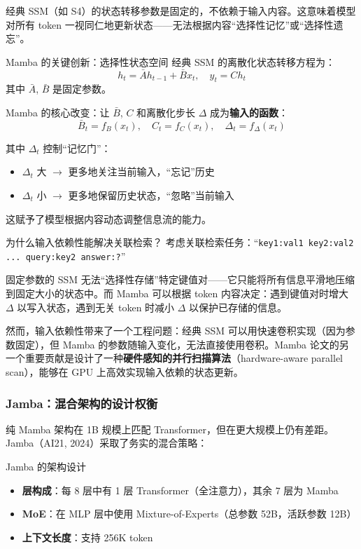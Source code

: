 经典 SSM（如 S4）的状态转移参数是固定的，不依赖于输入内容。这意味着模型对所有 token 一视同仁地更新状态——无法根据内容``选择性记忆''或``选择性遗忘''。

\begin{importantbox}{Mamba 的关键创新：选择性状态空间}
经典 SSM 的离散化状态转移方程为：
$$h_t = \bar{A} h_{t-1} + \bar{B} x_t, \quad y_t = C h_t$$
其中 $\bar{A}$, $\bar{B}$ 是固定参数。

Mamba 的核心改变：让 $\bar{B}$, $C$ 和离散化步长 $\Delta$ 成为\textbf{输入的函数}：
$$\bar{B}_t = f_B(x_t), \quad C_t = f_C(x_t), \quad \Delta_t = f_\Delta(x_t)$$

其中 $\Delta_t$ 控制``记忆门''：
\begin{itemize}
    \item $\Delta_t$ 大 $\rightarrow$ 更多地关注当前输入，``忘记''历史
    \item $\Delta_t$ 小 $\rightarrow$ 更多地保留历史状态，``忽略''当前输入
\end{itemize}
这赋予了模型根据内容动态调整信息流的能力。
\end{importantbox}

\begin{knowledgebox}{为什么输入依赖性能解决关联检索？}
考虑关联检索任务：``\texttt{key1:val1 key2:val2 ... query:key2 answer:?}''

固定参数的 SSM 无法``选择性存储''特定键值对——它只能将所有信息平滑地压缩到固定大小的状态中。而 Mamba 可以根据 token 内容决定：遇到键值对时增大 $\Delta$ 以写入状态，遇到无关 token 时减小 $\Delta$ 以保护已存储的信息。
\end{knowledgebox}

然而，输入依赖性带来了一个工程问题：经典 SSM 可以用快速卷积实现（因为参数固定），但 Mamba 的参数随输入变化，无法直接使用卷积。Mamba 论文的另一个重要贡献是设计了一种\textbf{硬件感知的并行扫描算法}（hardware-aware parallel scan），能够在 GPU 上高效实现输入依赖的状态更新。

\subsubsection{Jamba：混合架构的设计权衡}

纯 Mamba 架构在 1B 规模上匹配 Transformer，但在更大规模上仍有差距。Jamba（AI21, 2024）采取了务实的混合策略：

\begin{importantbox}{Jamba 的架构设计}
\begin{itemize}
    \item \textbf{层构成}：每 8 层中有 1 层 Transformer（全注意力），其余 7 层为 Mamba
    \item \textbf{MoE}：在 MLP 层中使用 Mixture-of-Experts（总参数 52B，活跃参数 12B）
    \item \textbf{上下文长度}：支持 256K token
\end{itemize}
\end{importantbox}

